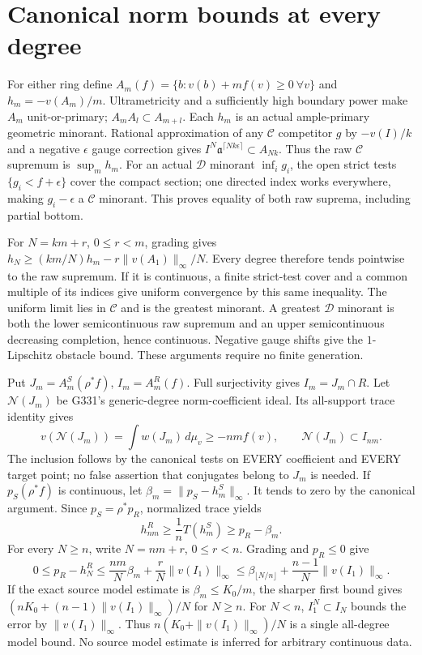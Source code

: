 \documentclass[11pt]{article}
\newcommand{\C}{\mathcal C}
\newcommand{\D}{\mathcal D}
\newcommand{\aa}{\mathfrak a}
\begin{document}
\section{Canonical norm bounds at every degree}
For either ring define $A_m(f)=\{b:v(b)+mf(v)\ge0\ \forall v\}$ and
$h_m=-v(A_m)/m$. Ultrametricity and a sufficiently high boundary power
make $A_m$ unit-or-primary; $A_mA_l\subset A_{m+l}$.
Each $h_m$ is an actual ample-primary geometric minorant.
Rational approximation of any $\C$ competitor $g$ by $-v(I)/k$ and a
negative $\epsilon$ gauge correction gives
$I^N\aa^{\lceil Nk\epsilon\rceil}\subset A_{Nk}$.
Thus the raw $\C$ supremum is $\sup_m h_m$.
For an actual $\D$ minorant $\inf_i g_i$, the open strict tests
$\{g_i<f+\epsilon\}$ cover the compact section; one directed index works
everywhere, making $g_i-\epsilon$ a $\C$ minorant.
This proves equality of both raw suprema, including partial bottom.

For $N=km+r$, $0\le r<m$, grading gives
$h_N\ge(km/N)h_m-r\|v(A_1)\|_\infty/N$.
Every degree therefore tends pointwise to the raw supremum.
If it is continuous, a finite strict-test cover and a common multiple
of its indices give uniform convergence by this same inequality.
The uniform limit lies in $\C$ and is the greatest minorant.
A greatest $\D$ minorant is both the lower semicontinuous raw supremum
and an upper semicontinuous decreasing completion, hence continuous.
Negative gauge shifts give the $1$-Lipschitz obstacle bound.
These arguments require no finite generation.

Put $J_m=A_m^S(\rho^*f)$, $I_m=A_m^R(f)$. Full surjectivity gives
$I_m=J_m\cap R$. Let $\mathcal N(J_m)$ be G331's generic-degree
norm-coefficient ideal. Its all-support trace identity gives
\[
 v(\mathcal N(J_m))
   =\int w(J_m)\,d\mu_v\ge-nmf(v),
 \qquad \mathcal N(J_m)\subset I_{nm}.
\]
The inclusion follows by the canonical tests on EVERY coefficient and
EVERY target point; no false assertion that conjugates belong to $J_m$
is needed. If $p_S(\rho^*f)$ is continuous, let
$\beta_m=\|p_S-h_m^S\|_\infty$. It tends to zero by the canonical argument.
Since $p_S=\rho^*p_R$, normalized trace yields
\[
 h_{nm}^R\ge \frac1nT(h_m^S)\ge p_R-\beta_m.
\]
For every $N\ge n$, write $N=nm+r$, $0\le r<n$. Grading and $p_R\le0$ give
\[
 0\le p_R-h_N^R
 \le\frac{nm}{N}\beta_m+\frac rN\|v(I_1)\|_\infty
 \le\beta_{\lfloor N/n\rfloor}
       +\frac{n-1}{N}\|v(I_1)\|_\infty .
\]
If the exact source model estimate is $\beta_m\le K_0/m$, the sharper
first bound gives $(nK_0+(n-1)\|v(I_1)\|_\infty)/N$ for $N\ge n$.
For $N<n$, $I_1^N\subset I_N$ bounds the error by $\|v(I_1)\|_\infty$.
Thus $n(K_0+\|v(I_1)\|_\infty)/N$ is a single all-degree model bound.
No source model estimate is inferred for arbitrary continuous data.
\end{document}
